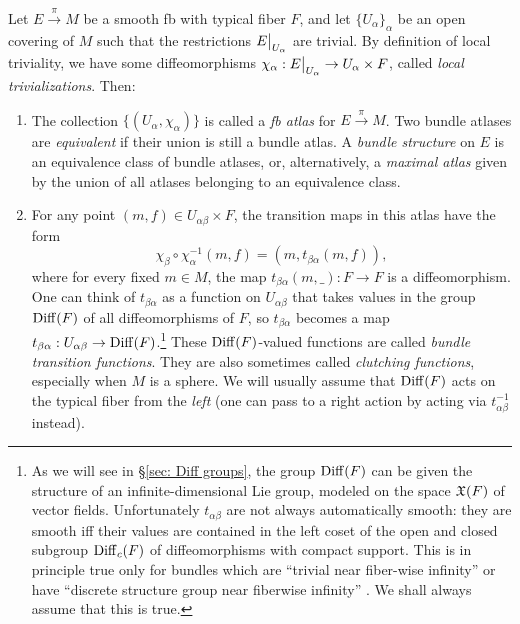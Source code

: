 \begin{defn}\label{def G-bundle}
    Let $E\overset{\pi}{\to}M$ be a smooth \gls{fb} with typical fiber $F$, and let $\{U_\alpha\}_\alpha$ be an open covering of $M$ such that the restrictions $\restr{E}{U_\alpha}$ are trivial. By definition of local triviality, we have some diffeomorphisms $\chi_\alpha: \restr{E}{U_\alpha}\to U_\alpha\times F$, called \emph{local trivializations}. Then:
\begin{enumerate}
    \item The collection $\{(U_\alpha,\chi_\alpha)\}$ is called a \emph{\gls{fb} atlas} for $E\overset{\pi}{\to}M$. Two bundle atlases are \emph{equivalent} if their union is still a bundle atlas. A \emph{bundle structure} on $E$ is an equivalence class of bundle atlases, or, alternatively, a \emph{maximal atlas} given by the union of all atlases belonging to an equivalence class.
    \item For any point $(m,f)\in U_{\alpha\beta}\times F$, the transition maps in this atlas have the form \[\chi_\beta\circ\chi_\alpha^{-1} (m,f)=(m, t_{\beta\alpha}(m,f)),\label{eq transition functions}\]
    where for every fixed $m\in M$, the map $t_{\beta\alpha}(m,\_):F\to F$ is a diffeomorphism. One can think of $t_{\beta\alpha}$ as a function on $U_{\alpha\beta}$ that takes values in the group $\operatorname{Diff}(F)$ of all diffeomorphisms of $F$, so $t_{\beta\alpha}$ becomes a map $t_{\beta\alpha}:U_{\alpha\beta}\to \operatorname{Diff}(F)$.\footnote{As we will see in \S\ref{sec: Diff groups}, the group $\operatorname{Diff}(F)$ can be given the structure of an infinite-dimensional Lie group, modeled on the space $\mathfrak{X}(F)$ of vector fields. Unfortunately $t_{\alpha\beta}$ are not always automatically smooth: they are smooth iff their values are contained in the left coset of the open and closed subgroup $\operatorname{Diff}_c(F)$ of diffeomorphisms with compact support. This is in principle true only for bundles which are ``trivial near fiber-wise infinity'' or have ``discrete structure group near fiberwise infinity'' \cite{Michor}. We shall always assume that this is true.}
    These $\operatorname{Diff}(F)$-valued functions are called \emph{bundle transition functions}. They are also sometimes called \emph{clutching functions}, especially when $M$ is a sphere. We will usually assume that $\operatorname{Diff}(F)$ acts on the typical fiber from the \emph{left} (one can pass to a right action by acting via $t_{\alpha\beta}^{-1}$ instead).
\end{enumerate}
\end{defn}

